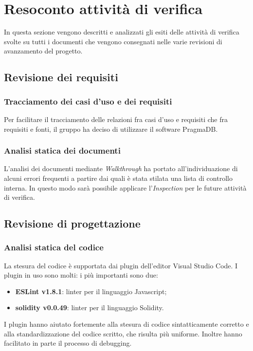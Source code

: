 \section{Resoconto attività di verifica}
In questa sezione vengono descritti e analizzati gli esiti delle attività
di verifica svolte su tutti i documenti che vengono consegnati nelle varie 
revisioni di avanzamento del progetto.

\subsection{Revisione dei requisiti}
\subsubsection{Tracciamento dei casi d'uso e dei requisiti}
Per facilitare il tracciamento delle relazioni fra casi d'uso e requisiti che
fra requisiti e fonti, il gruppo ha deciso di utilizzare il software PragmaDB.

\subsubsection{Analisi statica dei documenti}
L'analisi dei documenti mediante \textit{Walkthrough}\glo{} ha portato 
all'individuazione di alcuni errori frequenti a partire dai quali è stata 
stilata una lista di controllo interna. In questo modo sarà possibile applicare
l'\textit{Inspection}\glo{} per le future attività di verifica.

\subsection{Revisione di progettazione}
\subsubsection{Analisi statica del codice}
La stesura del codice è supportata dai plugin dell'editor Visual Studio Code. I plugin in uso sono molti: i più importanti sono due:
\begin{itemize}
	\item \textbf{ESLint v1.8.1}: linter per il linguaggio Javascript;
	\item \textbf{solidity v0.0.49}: linter per il linguaggio Solidity.
\end{itemize}
 I plugin hanno aiutato fortemente alla stesura di codice sintatticamente corretto e alla standardizzazione del codice scritto, che risulta più uniforme. Inoltre hanno facilitato in parte il processo di debugging.
